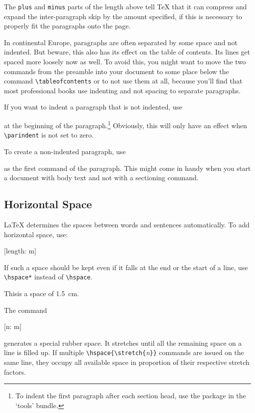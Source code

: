 The \texttt{plus} and \texttt{minus} parts of the length above tell
\TeX{} that it can compress and expand the inter-paragraph skip by the
amount specified, if this is necessary to properly fit the paragraphs
onto the page.

In continental Europe,
paragraphs are often separated by some space and not indented. But
beware, this also has its effect on the table of contents. Its lines
get spaced more loosely now as well. To avoid this, you might want to
move the two commands from the preamble into your document to some
place below the command \verb|\tableofcontents| or to not use them at all,
because you'll find that most professional books use indenting and not
spacing to separate paragraphs.

If you want to indent a paragraph that is not indented, use
\begin{lscommand}
\end{lscommand}
\noindent at the beginning of the paragraph.\footnote{To indent the first paragraph after each section head, use
  the  package in the `tools' bundle.} Obviously,
this will only have an effect when \verb|\parindent| is not set to
zero.

To create a non-indented paragraph, use
\begin{lscommand}
\end{lscommand}
\noindent as the first command of the paragraph. This might come in handy when
you start a document with body text and not with a sectioning command.

\subsection{Horizontal Space}\label{sec:hspace}

\LaTeX{} determines the spaces between words and sentences
automatically. To add horizontal space, use:
\begin{lscommand}
  [length: m]
\end{lscommand}
If such a space should be kept even if it falls at the end or the
start of a line, use \verb|\hspace*| instead of \verb|\hspace|.

\begin{example}
This\hspace{1.5cm}is a space
of \qty{1.5}{\cm}.
\end{example}

The command
\begin{lscommand}
  [n: m]
\end{lscommand}
\noindent generates a special rubber space. It stretches until all the
remaining space on a line is filled up. If multiple
\verb|\hspace{\stretch{|\emph{n}\verb|}}| commands are issued on the same
line, they occupy all available space in proportion of their respective
stretch factors.

